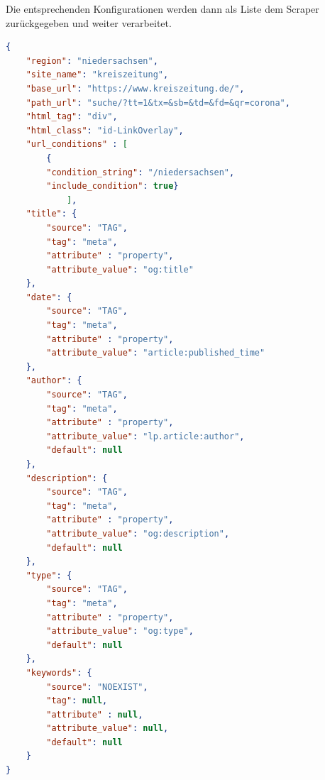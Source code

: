 \documentclass[12pt,twoside,a4paper,parskip]{scrbook}
\begin{document}
Die entsprechenden Konfigurationen werden dann als Liste dem Scraper zurückgegeben und weiter verarbeitet.
\begin{lstlisting}[caption=article\_config am Beispiel Niedersachsen,label=articleconfig,language=json]
{
    "region": "niedersachsen",
    "site_name": "kreiszeitung",
    "base_url": "https://www.kreiszeitung.de/",
    "path_url": "suche/?tt=1&tx=&sb=&td=&fd=&qr=corona",
    "html_tag": "div",
    "html_class": "id-LinkOverlay",
    "url_conditions" : [
        {
        "condition_string": "/niedersachsen",
        "include_condition": true}
        	],
    "title": {
        "source": "TAG",
        "tag": "meta",
        "attribute" : "property",
        "attribute_value": "og:title"
    },
    "date": {
        "source": "TAG",
        "tag": "meta",
        "attribute" : "property",
        "attribute_value": "article:published_time"
    },
    "author": {
        "source": "TAG",
        "tag": "meta",
        "attribute" : "property",
        "attribute_value": "lp.article:author",
        "default": null
    },
    "description": {
        "source": "TAG",
        "tag": "meta",
        "attribute" : "property",
        "attribute_value": "og:description",
        "default": null
    },
    "type": {
        "source": "TAG",
        "tag": "meta",
        "attribute" : "property",
        "attribute_value": "og:type",
        "default": null
    },
    "keywords": {
        "source": "NOEXIST",
        "tag": null,
        "attribute" : null,
        "attribute_value": null,
        "default": null
    }
} 
\end{lstlisting}
\end{document}
